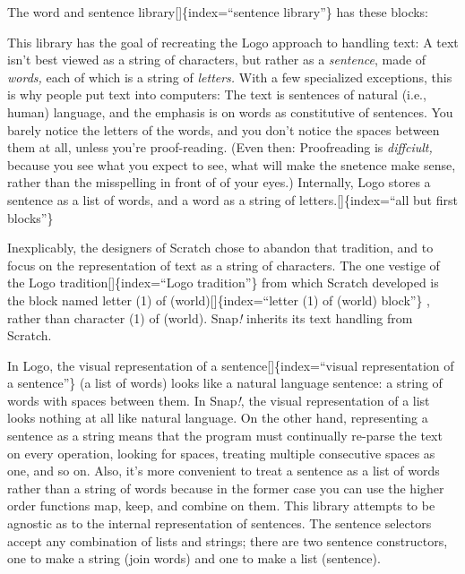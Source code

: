 \documentclass[
  letterpaper,
]{book}
\begin{document}
The \label{wordsent}{}word and sentence
library{[}{]}\{index=``sentence library''\} has these blocks:

This library has the goal of recreating the Logo approach to handling
text: A text isn't best viewed as a string of characters, but rather as
a \emph{sentence}, made of \emph{words,} each of which is a string of
\emph{letters.} With a few specialized exceptions, this is why people
put text into computers: The text is sentences of natural (i.e., human)
language, and the emphasis is on words as constitutive of sentences. You
barely notice the letters of the words, and you don't notice the spaces
between them at all, unless you're proof-reading. (Even then:
Proofreading is \emph{diffciult,} because you see what you expect to
see, what will make the snetence make sense, rather than the misspelling
in front of of your eyes.) Internally, Logo stores a sentence as a list
of words, and a word as a string of letters.{[}{]}\{index=``all but
first blocks''\}

Inexplicably, the designers of Scratch chose to abandon that tradition,
and to focus on the representation of text as a string of characters.
The one vestige of the Logo tradition{[}{]}\{index=``Logo tradition''\}
from which Scratch developed is the block named letter (1) of
(world){[}{]}\{index=``letter (1) of (world) block''\} , rather than
character (1) of (world). Snap\emph{!} inherits its text handling from
Scratch.

In Logo, the visual representation of a sentence{[}{]}\{index=``visual
representation of a sentence''\} (a list of words) looks like a natural
language sentence: a string of words with spaces between them. In
Snap\emph{!}, the visual representation of a list looks nothing at all
like natural language. On the other hand, representing a sentence as a
string means that the program must continually re-parse the text on
every operation, looking for spaces, treating multiple consecutive
spaces as one, and so on. Also, it's more convenient to treat a sentence
as a list of words rather than a string of words because in the former
case you can use the higher order functions map, keep, and combine on
them. This library attempts to be agnostic as to the internal
representation of sentences. The sentence selectors accept any
combination of lists and strings; there are two sentence constructors,
one to make a string (join words) and one to make a list (sentence).
\end{document}
